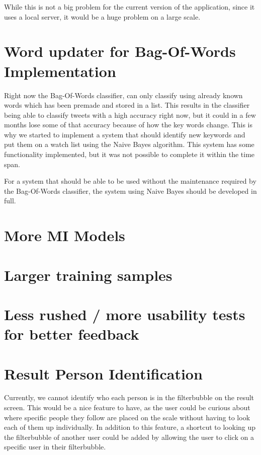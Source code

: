 While this is not a big problem for the current version of the application,
since it uses a local server, it would be a huge problem on a large scale. 

\section{Word updater for Bag-Of-Words Implementation}
Right now the Bag-Of-Words classifier, can only classify using already known
words which has been premade and stored in a list. This results in the
classifier being able to classify tweets with a high accuracy right now, but it
could in a few months lose some of that accuracy because of how the key words 
change. This is why we started to implement a system that should identify new
keywords and put them on a watch list using the Naive Bayes algorithm. This
system has some functionality implemented, but it was not possible to complete it within the time span.

For a system that should be able to be used without the maintenance required by
the Bag-Of-Words classifier, the system using Naive Bayes should be developed in
full.

\section{More MI  Models}

\section{Larger training samples}

\section{Less rushed / more usability tests for better feedback}

\section{Result Person Identification}
Currently, we cannot identify who each person is in the filterbubble on the
result screen. This would be a nice feature to have, as the user could be
curious about where specific people they follow are placed on the scale without
having to look each of them up individually. In addition to this feature, a
shortcut to looking up the filterbubble of another user could be added by
allowing the user to click on a specific user in their filterbubble.


